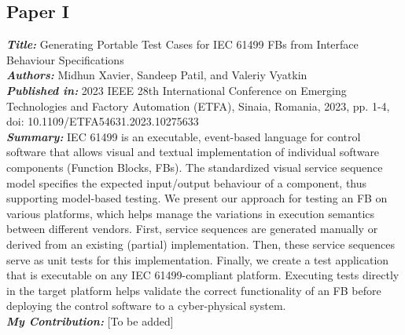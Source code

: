 \subsection{Paper I}
\textbf{\textit{Title:}} Generating Portable Test Cases for IEC 61499 FBs from Interface Behaviour Specifications\\
\textbf{\textit{Authors:}} Midhun Xavier, Sandeep Patil, and Valeriy Vyatkin\\
\textbf{\textit{Published in:}} 2023 IEEE 28th International Conference on Emerging Technologies and Factory Automation (ETFA), Sinaia, Romania, 2023, pp. 1-4, doi: 10.1109/ETFA54631.2023.10275633\\
\textbf{\textit{Summary:}} IEC 61499 is an executable, event-based language for control software that allows visual and textual implementation of individual software components (Function Blocks, FBs). The standardized visual service sequence model specifies the expected input/output behaviour of a component, thus supporting model-based testing. We present our approach for testing an FB on various platforms, which helps manage the variations in execution semantics between different vendors. First, service sequences are generated manually or derived from an existing (partial) implementation. Then, these service sequences serve as unit tests for this implementation. Finally, we create a test application that is executable on any IEC 61499-compliant platform. Executing tests directly in the target platform helps validate the correct functionality of an FB before deploying the control software to a cyber-physical system.\\
\textbf{\textit{My Contribution:}} [To be added]

